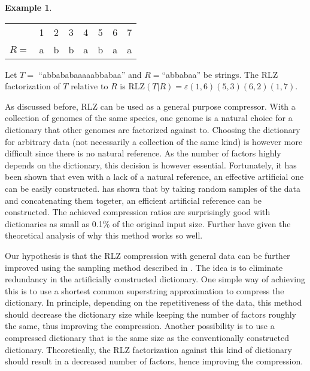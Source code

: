 \documentclass[english,twoside,censored,csm,algorithms-track-2020]{HYthesisML}
\theoremstyle{plain}
\theoremstyle{definition}
\newtheorem{example}[theorem]{Example}
\begin{document}
\begin{example}
  ~\\
  \vspace{-1cm}
  \begin{center}
  \begin{tabular}[H]{r c c c c c c c}
    &1&2&3&4&5&6&7 \\
    $R=$&a&b&b&a&b&a&a \\
  \end{tabular}
  \end{center}
  Let $T=$ ``abbababaaaaabbabaa'' and $R=$``abbabaa'' be strings. The RLZ factorization of $T$
  relative to $R$ is RLZ$(T|R)=\varepsilon(1,6)(5,3)(6,2)(1,7)$.
\end{example}

As discussed before, RLZ can be used as a general purpose compressor. With a collection of
genomes of the same species, one genome is a natural choice for a dictionary that other genomes are
factorized against to. Choosing the dictionary for arbitrary data (not necessarily a collection of the
same kind) is however more difficult since there is no natural reference. As the number of factors
highly depends on the dictionary, this decision is however essential. Fortunately, it has been shown
that even with a lack of a natural reference, an effective artificial one can be easily constructed.
\citep{Hoobin11} has shown that by taking random samples of the data and concatenating them togeter,
an efficient  artificial reference can be constructed. The achieved compression ratios are surprisingly
good with dictionaries as small as 0.1\% of the original input size. Further \citep{Gagie16} have
given the theoretical analysis of why this method works so well.

Our hypothesis is that the RLZ compression with general data can be further improved using the
sampling method described in \citep{Hoobin11}. The idea is to eliminate redundancy in the
artificially constructed dictionary. One simple way of achieving this is to use a shortest common
superstring approximation to compress the dictionary. In principle, depending on the repetitiveness
of the data, this method should decrease the dictionary size while keeping the number of factors
roughly the same, thus improving the compression. Another possibility is to use a compressed
dictionary that is the same size as the conventionally constructed dictionary. Theoretically, the
RLZ factorization against this kind of dictionary should result in a decreased number of factors,
hence improving the compression.
\end{document}
